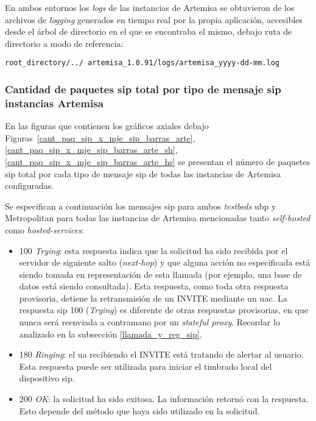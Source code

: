 \documentclass[a4paper,12pt]{report}
\begin{document}
En ambos entornos los \emph{logs} de las instancias de Artemisa se obtuvieron de los
archivos de \emph{logging} generados en tiempo real por la propia aplicación,
accesibles desde el árbol de directorio en el que se encontraba el mismo, debajo ruta de directorio 
a modo de referencia:\\
{\texttt{root\_directory/../
artemisa\_1.0.91/logs/artemisa\_yyyy-dd-mm.log}

\subsubsection{Cantidad de paquetes \ac{sip} total por tipo de mensaje \ac{sip} instancias Artemisa}

En las figuras que contienen los gráficos axiales debajo 
Figuras~\ref{cant_paq_sip_x_mje_sip_barras_arte}, \ref{cant_paq_sip_x_mje_sip_barras_arte_sh},
\ref{cant_paq_sip_x_mje_sip_barras_arte_hs} se presentan el número de paquetes \ac{sip}
total por cada tipo de mensaje \ac{sip} de todas las instancias de Artemisa
configuradas. 

Se especifican a continuación los mensajes \ac{sip} para ambos \emph{testbeds} \ac{ubp} y Metropolitan 
para todas las instancias de Artemisa mencionadas tanto \emph{self-hosted} como \emph{hosted-services}:\\

\begin{itemize}
\item 100 \emph{Trying}:
esta respuesta indica que la solicitud ha sido recibida por el servidor de
\mbox{siguiente} salto (\emph{next-hop}) y que alguna acción no especificada está siendo
tomada en \mbox{representación} de esta llamada (por ejemplo, una base de datos está
siendo consultada). Esta respuesta, como toda otra respuesta provisoria,
detiene la retransmisión de un \mbox{INVITE} mediante un \ac{uac}. La
respuesta \ac{sip} 100 (\emph{Trying}) es diferente de otras respuestas provisorias, en que
nunca será reenviada a contramano por un \emph{stateful proxy}. Recordar lo
analizado en la subsección \ref{llamada_y_reg_sip}. 

\item 180 \emph{Ringing}:
el \ac{ua} recibiendo el INVITE está tratando de alertar al usuario. Esta
\mbox{respuesta} puede ser utilizada para iniciar el timbrado local del dispositivo
\ac{sip}. 

\item 200 \emph{OK}:
la solicitud ha sido exitosa. La información retornó con la respuesta. Esto
depende del método que haya sido utilizado en la solicitud.


\end{itemize}}
\end{document}
